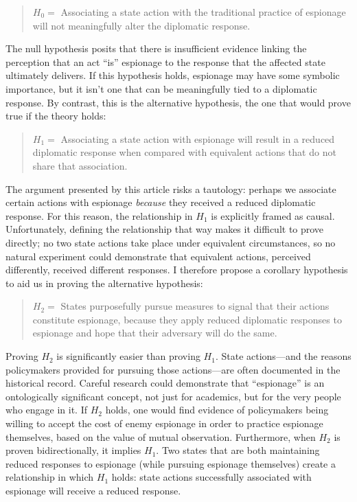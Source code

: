 \documentclass[14pt]{extarticle}
\begin{document}
\begin{quote}
$H_0 =$ Associating a state action with the traditional practice of espionage will not meaningfully alter the diplomatic response.
\end{quote}

The null hypothesis posits that there is insufficient evidence linking the perception that an act \enquote{is} espionage to the response that the affected state ultimately delivers. If this hypothesis holds, espionage may have some symbolic importance, but it isn't one that can be meaningfully tied to a diplomatic response. By contrast, this is the alternative hypothesis, the one that would prove true if the theory holds:

\begin{quote}
$H_1 =$ Associating a state action with espionage will result in a reduced diplomatic response when compared with equivalent actions that do not share that association.
\end{quote}

The argument presented by this article risks a tautology: perhaps we associate certain actions with espionage \emph{because} they received a reduced diplomatic response. For this reason, the relationship in $H_1$ is explicitly framed as causal. Unfortunately, defining the relationship that way makes it difficult to prove directly; no two state actions take place under equivalent circumstances, so no natural experiment could demonstrate that equivalent actions, perceived differently, received different responses. I therefore propose a corollary hypothesis to aid us in proving the alternative hypothesis:

\begin{quote}
$H_2 =$ States purposefully pursue measures to signal that their actions constitute espionage, because they apply reduced diplomatic responses to espionage and hope that their adversary will do the same.
\end{quote}

Proving $H_2$ is significantly easier than proving $H_1$. State actions---and the reasons policymakers provided for pursuing those actions---are often documented in the historical record. Careful research could demonstrate that \enquote{espionage} is an ontologically significant concept, not just for academics, but for the very people who engage in it. If $H_2$ holds, one would find evidence of policymakers being willing to accept the cost of enemy espionage in order to practice espionage themselves, based on the value of mutual observation. Furthermore, when $H_2$ is proven bidirectionally, it implies $H_1$. Two states that are both maintaining reduced responses to espionage (while pursuing espionage themselves) create a relationship in which $H_1$ holds: state actions successfully associated with espionage will receive a reduced response.
\end{document}
